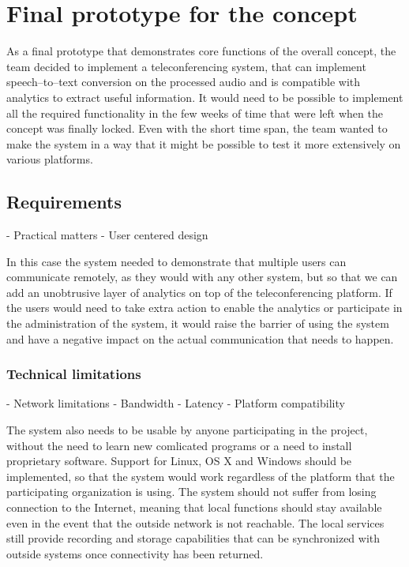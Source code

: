 \documentclass[english,12pt,a4paper,dvips]{article}
\begin{document}
\section{Final prototype for the concept}

As a final prototype that demonstrates core functions of the overall concept, the team decided to implement a teleconferencing system, that can implement speech--to--text conversion on the processed audio and is compatible with analytics to extract useful information. It would need to be possible to implement all the required functionality in the few weeks of time that were left when the concept was finally locked. Even with the short time span, the team wanted to make the system in a way that it might be possible to test it more extensively on various platforms. 

\subsection{Requirements}
- Practical matters
- User centered design

In this case the system needed to demonstrate that multiple users can communicate remotely, as they would with any other system, but so that we can add an unobtrusive layer of analytics on top of the teleconferencing platform. If the users would need to take extra action to enable the analytics or participate in the administration of the system, it would raise the barrier of using the system and have a negative impact on the actual communication that needs to happen. 


\subsubsection{Technical limitations}

- Network limitations
- Bandwidth
- Latency
- Platform compatibility

The system also needs to be usable by anyone participating in the project, without the need to learn new comlicated programs or a need to install proprietary software. Support for Linux, OS X and Windows should be implemented, so that the system would work regardless of the platform that the participating organization is using. The system should not suffer from losing connection to the Internet, meaning that local functions should stay available even in the event that the outside network is not reachable. The local services still provide recording and storage capabilities that can be synchronized with outside systems once connectivity has been returned.
\end{document}
